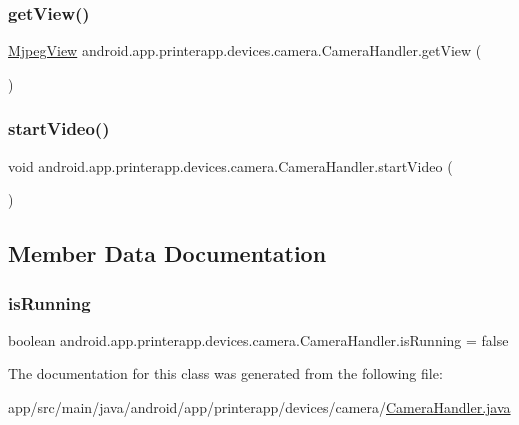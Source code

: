 \subsubsection{\texorpdfstring{get\+View()}{getView()}}
{\footnotesize\ttfamily \hyperlink{classandroid_1_1app_1_1printerapp_1_1devices_1_1camera_1_1_mjpeg_view}{Mjpeg\+View} android.\+app.\+printerapp.\+devices.\+camera.\+Camera\+Handler.\+get\+View (\begin{DoxyParamCaption}{ }\end{DoxyParamCaption})}

\mbox{\label{classandroid_1_1app_1_1printerapp_1_1devices_1_1camera_1_1_camera_handler_a90a826b2cb174d7a711344c7cc300a46}} 
\subsubsection{\texorpdfstring{start\+Video()}{startVideo()}}
{\footnotesize\ttfamily void android.\+app.\+printerapp.\+devices.\+camera.\+Camera\+Handler.\+start\+Video (\begin{DoxyParamCaption}{ }\end{DoxyParamCaption})}



\subsection{Member Data Documentation}
\mbox{\label{classandroid_1_1app_1_1printerapp_1_1devices_1_1camera_1_1_camera_handler_a2aae0d524d7286586903498239bd1d67}} 
\subsubsection{\texorpdfstring{is\+Running}{isRunning}}
{\footnotesize\ttfamily boolean android.\+app.\+printerapp.\+devices.\+camera.\+Camera\+Handler.\+is\+Running = false}



The documentation for this class was generated from the following file\+:\begin{DoxyCompactItemize}
\item 
app/src/main/java/android/app/printerapp/devices/camera/\hyperlink{_camera_handler_8java}{Camera\+Handler.\+java}\end{DoxyCompactItemize}
